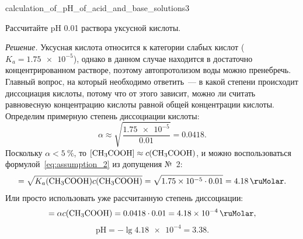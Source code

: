 \begin{example}{}{calculation_of_pH_of_acid_and_base_solutions3}
    \begin{condition}
        Рассчитайте pH \qty{0,01}{\ruMolar} раствора уксусной кислоты.
    \end{condition}

    \medskip

    \textit{Решение.} Уксусная кислота относится к категории слабых кислот ($K_a = \num{1,75e-5}$), однако в данном случае находится в достаточно концентрированном растворе, поэтому автопротолизом воды можно пренебречь. Главный вопрос, на который необходимо ответить~--- в какой степени происходит диссоциация кислоты, потому что от этого зависит, можно ли считать равновесную концентрацию кислоты равной общей концентрации кислоты. Определим примерную степень диссоциации кислоты:
    \begin{equation*}
        \alpha \approx \sqrt{\frac{\num{1,75e-5}}{\num{0,01}}} = \num{0,0418}.
    \end{equation*}
    Поскольку $\alpha < \qty{5}{\percent}$, то $[\ce{CH3COOH}] \approx c(\ce{CH3COOH})$, и можно воспользоваться формулой~\eqref{eq:assumption_2} из допущения №~2:
    \begin{equation*}
        [\ce{H^+}] = \sqrt{K_a(\ce{CH3COOH})c(\ce{CH3COOH})} = \sqrt{\num{1,75e-5}\cdot\num{0,01}} = \qty{4,18}{\ruMolar}.
    \end{equation*}
    Или просто использовать уже рассчитанную степень диссоциации:
    \begin{equation*}
        [\ce{H^+}] = \alpha c(\ce{CH3COOH}) = \num{0,0418}\cdot\num{0,01} = \qty{4,18e-4}{\ruMolar},
    \end{equation*}
    \begin{equation*}
        \text{pH} = -\lg\num{4,18e-4} = \num{3,38}.
    \end{equation*}
\end{example}

